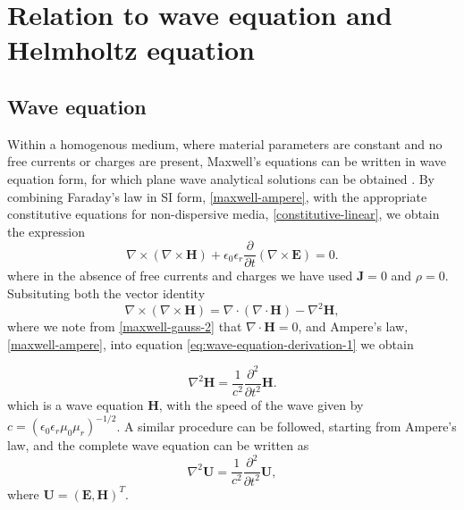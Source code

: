 \section{Relation to wave equation and Helmholtz equation}
%
\subsection{Wave equation}

Within a homogenous medium, where material parameters are constant and no free currents or charges are present, Maxwell's equations can be written in wave equation form, for which plane wave analytical solutions can be obtained \cite{Jackson:490457}. By combining Faraday's law in SI form, \ref{maxwell-ampere}, with the appropriate constitutive equations for non-dispersive media, \ref{constitutive-linear}, we obtain the expression
\begin{equation}
\label{eq:wave-equation-derivation-1}
\nabla \times ( \nabla \times \mathbf{H} ) + \epsilon_0 \epsilon_r \frac{\partial }{\partial t} ( \nabla \times \mathbf{E} ) = 0 .
\end{equation}
where in the absence of free currents and charges we have used $\mathbf{J} = 0$ and $\rho = 0$.
Subsituting both the vector identity
$$
\nabla \times ( \nabla \times \mathbf{H} ) = \nabla \cdot ( \nabla \cdot \mathbf{H} ) - \nabla^2 \mathbf{H},
$$
where we note from \ref{maxwell-gauss-2} that $\nabla \cdot \mathbf{H} = 0$, and Ampere's law, \ref{maxwell-ampere}, into equation \ref{eq:wave-equation-derivation-1} we obtain

\begin{equation}
\label{maxwell-wave-eqtn-E}
    \nabla^2 \mathbf{H} = \frac{1}{c^2} \frac{\partial ^2 }{\partial t ^2 } \mathbf{H} .
\end{equation}
which is a wave equation $\mathbf{H}$, with the speed of the wave given by $c = (\epsilon_0 \epsilon_r \mu_0 \mu_r )^{-1/2}$. A similar procedure can be followed, starting from Ampere's law, and the complete wave equation can be written as
\begin{equation}
\label{maxwell-wave-eqtn-E}
    \nabla^2 \mathbf{U} = \frac{1}{c^2} \frac{\partial ^2 }{\partial t ^2 } \mathbf{U} ,
\end{equation}
where $\mathbf{U} = ( \mathbf{E}, \mathbf{H} )^T$.


